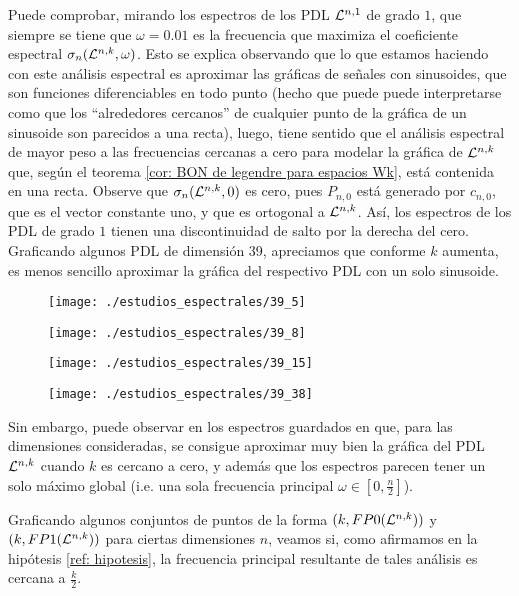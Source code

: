 Puede comprobar, mirando los espectros
de los PDL $\mathcal{L}^{n,1}$ de grado $1$,
que siempre se tiene que $ \omega = 0.01$ es la frecuencia
que maximiza el coeficiente espectral
$\sigma_{n}(\mathcal{L}^{n,k}, \omega)$.
Esto se explica observando que
lo que estamos haciendo con este análisis espectral
es aproximar las gráficas de señales con sinusoides, que son
funciones diferenciables en todo punto
(hecho que puede
puede interpretarse
como que los ``alrededores
cercanos'' de cualquier
punto de la gráfica de un sinusoide son 
parecidos a una recta), luego, tiene sentido que  
el análisis espectral de mayor peso a las 
frecuencias cercanas a cero
para modelar la gráfica de $\mathcal{L}^{n,k}$
que, según el teorema 
\ref{cor: BON de legendre para espacios Wk}, está contenida
en una recta. Observe que 
$\sigma_{n}(\mathcal{L}^{n,k}, 0)$ es cero, pues
$P_{n, 0}$ está generado por
$c_{n,0}$, que es el vector constante uno, y que 
es ortogonal a $\mathcal{L}^{n,k}$. Así, los espectros
de los PDL de grado $1$ tienen una discontinuidad de salto
por la derecha del cero. \\


Graficando algunos PDL de dimensión
39, apreciamos que conforme $k$ aumenta, es menos
sencillo aproximar la gráfica del respectivo PDL
con un solo sinusoide.
\begin{figure}[H]
	\sidecaption{
	}
	\centering
	\texttt{[image: ./estudios\_espectrales/39\_5]} 
\end{figure}	
\begin{figure}[H]
	\sidecaption{
	}
	\centering
	\texttt{[image: ./estudios\_espectrales/39\_8]} 
\end{figure}	
\begin{figure}[H]
	\sidecaption{
	}
	\centering
	\texttt{[image: ./estudios\_espectrales/39\_15]} 
\end{figure}	
\begin{figure}[H]
	\sidecaption{
	}
	\centering
	\texttt{[image: ./estudios\_espectrales/39\_38]} 
\end{figure}	

Sin embargo, puede observar en los espectros guardados en 
 que, para las dimensiones consideradas,
se consigue aproximar muy bien la gráfica del PDL
$\mathcal{L}^{n,k}$ cuando $k$ es cercano a cero, y además 
que los espectros parecen tener un solo máximo global
(i.e. una sola frecuencia principal 
$\omega \in \left[0, \frac{n}{2} \right]$).

Graficando algunos conjuntos de puntos
de la forma
$(k, FP0(\mathcal{L}^{n,k}))$ y 
$(k, FP1(\mathcal{L}^{n,k}))$ para ciertas
dimensiones $n$, veamos si, como 
afirmamos en la hipótesis 
\ref{ref: hipotesis}, la frecuencia principal
resultante de tales análisis es cercana
a $\frac{k}{2}$.

